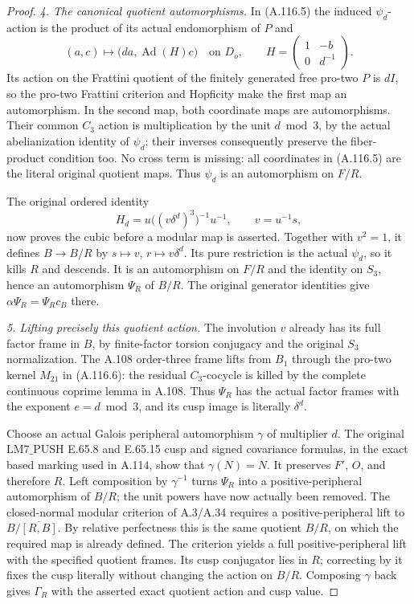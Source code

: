 \begin{proof}
\medskip\noindent\emph{4. The canonical quotient automorphisms.}
In (A.116.5) the induced \(\psi_d\)-action is the product of its
actual endomorphism of \(P\) and
\[
 (a,c)\longmapsto\bigl(da,\operatorname{Ad}(H)c\bigr)
 \quad\text{on }D_o,\qquad
 H=\begin{pmatrix}1&-b\\0&d^{-1}\end{pmatrix}.
                                                                  \tag{A.116.7}
\]
Its action on the Frattini quotient of the finitely generated
free pro-two \(P\) is \(dI\), so the pro-two Frattini criterion and
Hopficity make the first map an automorphism. In the second map,
both coordinate maps are automorphisms. Their common \(C_3\)
action is multiplication by the unit \(d\bmod3\), by the actual
abelianization identity of \(\psi_d\); their inverses consequently
preserve the fiber-product condition too. No cross term is missing:
all coordinates in (A.116.5) are the literal original quotient maps.
Thus \(\psi_d\) is an automorphism on \(F/R\).

The original ordered identity
\[
 H_d=u\bigl((v\delta^d)^3\bigr)^{-1}u^{-1},\qquad v=u^{-1}s,
                                                                  \tag{A.116.8}
\]
now proves the cubic before a modular map is asserted. Together with
\(v^2=1\), it defines \(B\to B/R\) by
\(s\mapsto v\), \(r\mapsto v\delta^d\).
Its pure restriction is the actual \(\psi_d\), so it kills \(R\)
and descends. It is an automorphism on \(F/R\) and the identity on
\(S_3\), hence an automorphism \(\Psi_R\) of \(B/R\).
The original generator identities give
\(\alpha\Psi_R=\Psi_Rc_B\) there.

\medskip\noindent\emph{5. Lifting precisely this quotient action.}
The involution \(v\) already has its full factor frame in \(B\), by
finite-factor torsion conjugacy and the original \(S_3\) normalization.
The A.108 order-three frame lifts from \(B_1\) through the pro-two
kernel \(M_{21}\) in (A.116.6): the residual \(C_3\)-cocycle is
killed by the complete continuous coprime lemma in A.108.
Thus \(\Psi_R\) has the actual factor frames with the exponent
\(e=d\bmod3\), and its cusp image is literally \(\delta^d\).

Choose an actual Galois peripheral automorphism \(\gamma\) of
multiplier \(d\). The original \(\mathrm{LM7\_PUSH}\) E.65.8 and
E.65.15 cusp and signed covariance formulas, in the exact based
marking used in A.114, show that \(\gamma(N)=N\).
It preserves \(F'\), \(O\), and therefore \(R\).
Left composition by \(\gamma^{-1}\) turns \(\Psi_R\) into a
positive-peripheral automorphism of \(B/R\); the unit powers have
now actually been removed. The closed-normal modular criterion
of A.3/A.34 requires a positive-peripheral lift to
\(B/\overline{[R,B]}\). By relative perfectness this is the same
quotient \(B/R\), on which the required map is already defined.
The criterion yields a full positive-peripheral lift with the specified
quotient frames. Its cusp conjugator lies in \(R\); correcting by it
fixes the cusp literally without changing the action on \(B/R\).
Composing \(\gamma\) back gives \(\Gamma_R\) with the asserted exact
quotient action and cusp value.


\end{proof}
